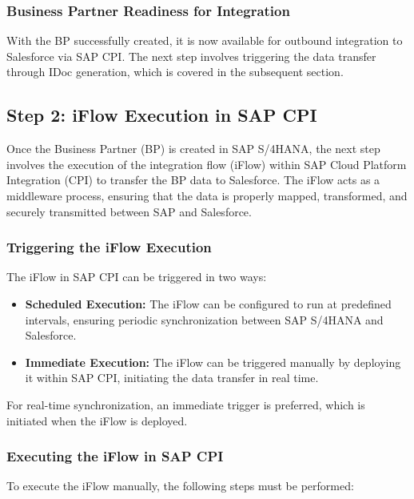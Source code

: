 \subsubsection{Business Partner Readiness for Integration}
With the BP successfully created, it is now available for outbound integration to Salesforce via SAP CPI. The next step involves triggering the data transfer through IDoc generation, which is covered in the subsequent section.


\subsection{Step 2: iFlow Execution in SAP CPI}

Once the Business Partner (BP) is created in SAP S/4HANA, the next step involves the execution of the integration flow (iFlow) within SAP Cloud Platform Integration (CPI) to transfer the BP data to Salesforce. The iFlow acts as a middleware process, ensuring that the data is properly mapped, transformed, and securely transmitted between SAP and Salesforce.

\subsubsection{Triggering the iFlow Execution}
The iFlow in SAP CPI can be triggered in two ways:
\begin{itemize}
    \item \textbf{Scheduled Execution:} The iFlow can be configured to run at predefined intervals, ensuring periodic synchronization between SAP S/4HANA and Salesforce.
    \item \textbf{Immediate Execution:} The iFlow can be triggered manually by deploying it within SAP CPI, initiating the data transfer in real time.
\end{itemize}

For real-time synchronization, an immediate trigger is preferred, which is initiated when the iFlow is deployed.

\subsubsection{Executing the iFlow in SAP CPI}
To execute the iFlow manually, the following steps must be performed:

